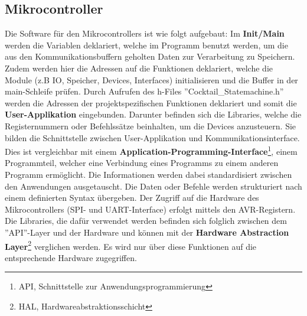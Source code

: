 \subsection{Mikrocontroller}
\label{subsec:Software_Atmega2560}

Die Software für den Mikrocontrollers ist wie folgt aufgebaut: 
Im \textbf{Init/Main} werden die Variablen deklariert, welche im Programm benutzt werden, um die aus den Kommunikationsbuffern geholten Daten zur Verarbeitung zu Speichern.
Zudem werden hier die Adressen auf die Funktionen deklariert, welche die Module (z.B IO, Speicher, Devices, Interfaces) initialisieren und die Buffer in der main-Schleife prüfen.
Durch Aufrufen des h-Files ''Cocktail\_Statemachine.h'' werden die Adressen der projektspezifischen Funktionen deklariert und somit die \textbf{User-Applikation} eingebunden. Darunter befinden sich die Libraries, welche die Registernummern oder Befehlssätze beinhalten, um die Devices anzusteuern.
Sie bilden die Schnittstelle zwischen User-Applikation und Kommunikationsinterface.
Dies ist vergleichbar mit einem \textbf{Application-Programming-Interface}\footnote{API, Schnittstelle zur Anwendungsprogrammierung}, einem Programmteil, welcher eine Verbindung eines Programms zu einem anderen Programm ermöglicht. 
Die Informationen werden dabei standardisiert zwischen den Anwendungen ausgetauscht.
Die Daten oder Befehle werden strukturiert nach einem definierten Syntax übergeben.
Der Zugriff auf die Hardware des Mikrocontrollers (SPI- und UART-Interface) erfolgt mittels den AVR-Registern.
Die Libraries, die dafür verwendet werden befinden sich folglich zwischen dem ''API''-Layer und der Hardware und können mit der \textbf{Hardware Abstraction Layer}\footnote{HAL, Hardwareabstraktionsschicht} verglichen werden.
Es wird nur über diese Funktionen auf die entsprechende Hardware zugegriffen. \cite{geisler_was_2018}